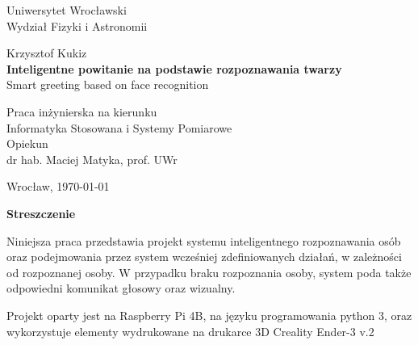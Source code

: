 \documentclass[a4paper,12pt,reqno]{article}
\begin{document}


\begin{center}

\thispagestyle{empty}

\Large 
Uniwersytet Wrocławski\\
Wydział Fizyki i Astronomii\\
\vspace{0.8cm}
\vspace{1.8cm}

\Large Krzysztof Kukiz \\
\vspace{3.2cm}
\Large \textbf{Inteligentne powitanie na podstawie rozpoznawania twarzy} \\
\vspace{1.5cm}
Smart greeting based on face recognition
\end{center}
\vspace{3.7cm}
\begin{flushright}
\large{Praca inżynierska na kierunku \\Informatyka Stosowana i Systemy Pomiarowe \\}
\vspace{0.5cm}
\large{ Opiekun \\ dr hab. Maciej Matyka, prof. UWr}
\end{flushright}
\vspace{2.2cm}

\begin{center}
\large Wrocław, \today
\end{center}

\newpage

\tableofcontents

\newpage

%
%
\begin{flushleft}
\Large \textbf{Streszczenie}
\end{flushleft}
\vspace{1cm}

Niniejsza praca przedstawia projekt systemu inteligentnego rozpoznawania osób oraz podejmowania przez system wcześniej zdefiniowanych działań, w zależności od rozpoznanej osoby. W przypadku braku rozpoznania osoby, system poda także odpowiedni komunikat głosowy oraz wizualny. 

Projekt oparty jest na Raspberry Pi 4B, na języku programowania python 3, oraz wykorzystuje elementy wydrukowane na drukarce 3D Creality Ender-3 v.2
\end{document}
